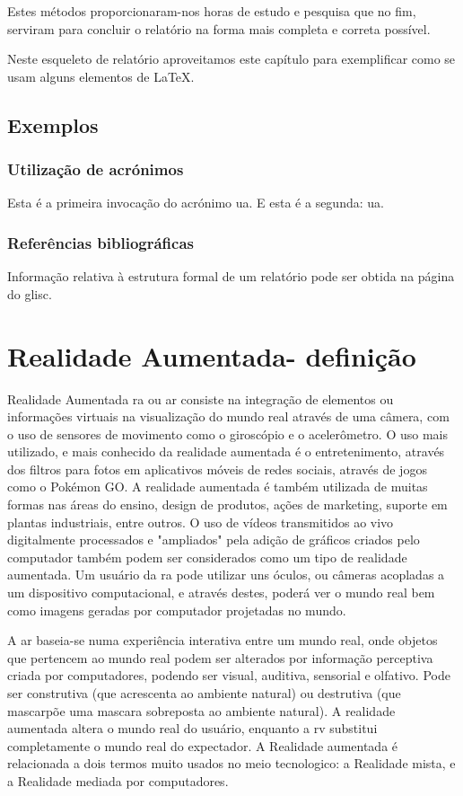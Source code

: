 \documentclass{report}
\begin{document}
Estes métodos proporcionaram-nos horas de estudo e pesquisa que no fim, serviram para concluir o relatório na forma mais completa e correta possível.

Neste esqueleto de relatório aproveitamos este capítulo para exemplificar
como se usam alguns elementos de {\LaTeX}.

\section{Exemplos}
\subsection{Utilização de acrónimos}
Esta é a primeira invocação do acrónimo \ac{ua}. E esta é a segunda: \ac{ua}.

\subsection{Referências bibliográficas}
Informação relativa à estrutura formal de um relatório pode ser obtida na página do \ac{glisc}\cite{glisc}.

\chapter{Realidade Aumentada- definição}
\label{chap.resultados}
Realidade Aumentada \ac{ra} ou \ac{ar} consiste na integração de elementos ou informações virtuais na visualização do mundo real através de uma câmera, com o uso de sensores de movimento como o giroscópio e o acelerômetro. O uso mais utilizado, e mais conhecido da realidade aumentada é o entretenimento, através dos filtros para fotos em aplicativos móveis de redes sociais, através de jogos como o Pokémon GO. A realidade aumentada é também utilizada de muitas formas nas áreas do ensino, design de produtos, ações de marketing, suporte em plantas industriais, entre outros. O uso de vídeos transmitidos ao vivo digitalmente processados e "ampliados" pela adição de gráficos criados pelo computador também podem ser considerados como um tipo de realidade aumentada. Um usuário da \ac{ra} pode utilizar uns óculos, ou câmeras acopladas a um dispositivo computacional, e através destes, poderá ver o mundo real bem como imagens geradas por computador projetadas no mundo.

A \ac{ar} baseia-se numa experiência interativa entre um mundo real, onde objetos que pertencem ao mundo real podem ser alterados por informação perceptiva criada por computadores, podendo ser visual, auditiva, sensorial e olfativo. Pode ser construtiva (que acrescenta ao ambiente natural) ou destrutiva (que mascarpõe uma mascara sobreposta ao ambiente natural). A realidade aumentada altera o mundo real do usuário, enquanto a \ac{rv} substitui completamente o mundo real do expectador. A Realidade aumentada é relacionada a dois termos muito usados no meio tecnologico: a Realidade mista, e a Realidade mediada por computadores. 
\end{document}

